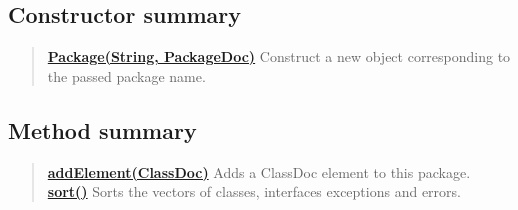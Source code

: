 \documentclass[11pt,a4paper]{report}
\begin{document}
{\subsection{Constructor summary}{
\begin{verse}
\hyperlink{org.stfm.texdoclet.Package(java.lang.String, com.sun.javadoc.PackageDoc)}{{\bf Package(String, PackageDoc)}} Construct a new object corresponding to the passed package name.\\
\end{verse}
}
\subsection{Method summary}{
\begin{verse}
\hyperlink{org.stfm.texdoclet.Package.addElement(com.sun.javadoc.ClassDoc)}{{\bf addElement(ClassDoc)}} Adds a ClassDoc element to this package.\\
\hyperlink{org.stfm.texdoclet.Package.sort()}{{\bf sort()}} Sorts the vectors of classes, interfaces exceptions and errors.\\
\end{verse}
}
}
\end{document}
